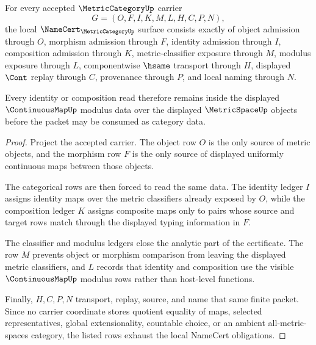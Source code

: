 \begin{theorem}
\label{thm:metric-category-namecert-obligations}
For every accepted $\MetricCategoryUp$ carrier
$$
G=(O,F,I,K,M,L,H,C,P,N),
$$
the local $\NameCert_{\MetricCategoryUp}$ surface consists exactly of object admission through $O$, morphism admission through $F$, identity admission through $I$, composition admission through $K$, metric-classifier exposure through $M$, modulus exposure through $L$, componentwise $\hsame$ transport through $H$, displayed $\Cont$ replay through $C$, provenance through $P$, and local naming through $N$.

Every identity or composition read therefore remains inside the displayed $\ContinuousMapUp$ modulus data over the displayed $\MetricSpaceUp$ objects before the packet may be consumed as category data.
\end{theorem}
\begin{proof}
Project the accepted carrier. The object row $O$ is the only source of metric objects, and the morphism row $F$ is the only source of displayed uniformly continuous maps between those objects.

The categorical rows are then forced to read the same data. The identity ledger $I$ assigns identity maps over the metric classifiers already exposed by $O$, while the composition ledger $K$ assigns composite maps only to pairs whose source and target rows match through the displayed typing information in $F$.

The classifier and modulus ledgers close the analytic part of the certificate. The row $M$ prevents object or morphism comparison from leaving the displayed metric classifiers, and $L$ records that identity and composition use the visible $\ContinuousMapUp$ modulus rows rather than host-level functions.

Finally, $H,C,P,N$ transport, replay, source, and name that same finite packet. Since no carrier coordinate stores quotient equality of maps, selected representatives, global extensionality, countable choice, or an ambient all-metric-spaces category, the listed rows exhaust the local NameCert obligations.
\end{proof}

